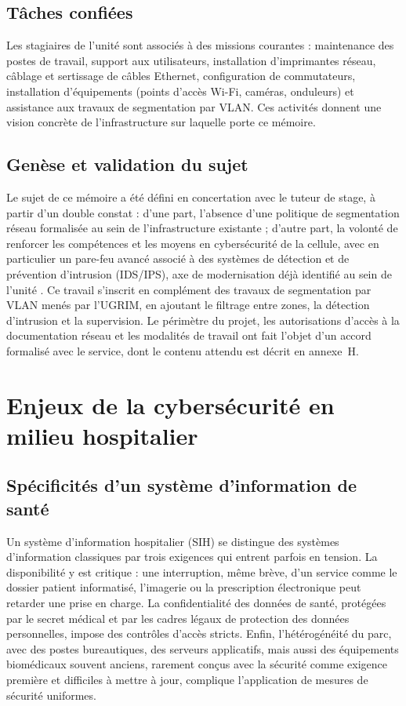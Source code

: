 \subsection{Tâches confiées}
Les stagiaires de l'unité sont associés à des missions courantes : maintenance des postes de travail, support aux utilisateurs, installation d'imprimantes réseau, câblage et sertissage de câbles Ethernet, configuration de commutateurs, installation d'équipements (points d'accès Wi-Fi, caméras, onduleurs) et assistance aux travaux de segmentation par VLAN\cite{kaho2026}. Ces activités donnent une vision concrète de l'infrastructure sur laquelle porte ce mémoire. 

\subsection{Genèse et validation du sujet}

Le sujet de ce mémoire a été défini en concertation avec le tuteur de stage, à partir d'un double constat : d'une part, l'absence d'une politique de segmentation réseau formalisée au sein de l'infrastructure existante ; d'autre part, la volonté de renforcer les compétences et les moyens en cybersécurité de la cellule, avec en particulier un pare-feu avancé associé à des systèmes de détection et de prévention d'intrusion (IDS/IPS), axe de modernisation déjà identifié au sein de l'unité\cite{kaho2026} . Ce travail s'inscrit en complément des travaux de segmentation par VLAN menés par l'UGRIM, en ajoutant le filtrage entre zones, la détection d'intrusion et la supervision. Le périmètre du projet, les autorisations d'accès à la documentation réseau et les modalités de travail ont fait l'objet d'un accord formalisé avec le service, dont le contenu attendu est décrit en annexe~H.

\section{Enjeux de la cybersécurité en milieu hospitalier}

\subsection{Spécificités d'un système d'information de santé}

Un système d'information hospitalier (SIH) se distingue des systèmes d'information classiques par trois exigences qui entrent parfois en tension. La disponibilité y est critique : une interruption, même brève, d'un service comme le dossier patient informatisé, l'imagerie ou la prescription électronique peut retarder une prise en charge. La confidentialité des données de santé, protégées par le secret médical et par les cadres légaux de protection des données personnelles, impose des contrôles d'accès stricts. Enfin, l'hétérogénéité du parc, avec des postes bureautiques, des serveurs applicatifs, mais aussi des équipements biomédicaux souvent anciens, rarement conçus avec la sécurité comme exigence première et difficiles à mettre à jour, complique l'application de mesures de sécurité uniformes.

